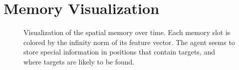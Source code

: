\chapter{Memory Visualization}
\label{app:memory}

\begin{figure}
    \centering
    
    \caption[Spatial memory visualization]{Visualization of the spatial memory over time. Each memory slot is colored by the infinity norm of its feature vector. The agent seems to store special information in positions that contain targets, and where targets are likely to be found.}
    \label{fig:path-scene}
\end{figure}    
